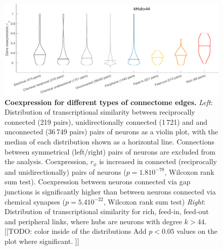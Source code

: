 \documentclass[10pt,letterpaper]{article}
\begin{document}
{%
\begin{figure}[h]
\centering
    \includegraphics[width=1\textwidth]{distributionsALL.pdf}
    \caption{
\textbf{Coexpression for different types of connectome edges.}
\emph{Left}: Distribution of transcriptional similarity between reciprocally connected (219 pairs), unidirectionally connected (1\,721) and  and unconnected (36\,749 pairs) pairs of neurons as a violin plot, with the median of each distribution shown as a horizontal line.
Connections between symmetrical (left/right) pairs of neurons are excluded from the analysis.
Coexpression, $r_\phi$ is increased in connected (reciprocally and unidirectionally) pairs of neurons ($p = 1.8 10^{-78}$, Wilcoxon rank sum test).
Coexpression between neurons connected via gap junctions is significantly higher than between neurons connected via chemical synapses ($p = 5.4 10^{-22}$, Wilcoxon rank sum test)
\emph{Right}: Distribution of transcriptional similarity for rich, feed-in, feed-out and peripheral links, where hubs are neurons with degree $k>44$.
[[TODO: color inside of the distributions
Add $p<0.05$ values on the plot where significant.
]]
\label{fig:S_RFPdistributions}
}
\end{figure}

}
\end{document}
